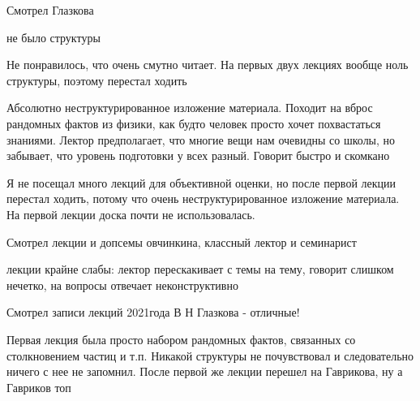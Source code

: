                 \begin{commentbox} 
                    Смотрел Глазкова 
                \end{commentbox} 
            
                \begin{commentbox} 
                    не было структуры 
                \end{commentbox} 
            
                \begin{commentbox} 
                    Не понравилось, что очень смутно читает. На первых двух лекциях вообще ноль структуры, поэтому перестал ходить
                
                \end{commentbox} 
            
                \begin{commentbox} 
                    Абсолютно неструктурированное изложение материала. Походит на вброс рандомных фактов из физики, как будто человек просто хочет похвастаться знаниями. Лектор предполагает, что многие вещи нам очевидны со школы, но забывает, что уровень подготовки у всех разный. Говорит быстро и скомкано 
                \end{commentbox} 
            
                \begin{commentbox} 
                    Я не посещал много лекций для объективной оценки, но после первой лекции перестал ходить, потому что очень неструктурированное изложение материала. На первой лекции доска почти не использовалась. 
                \end{commentbox} 
            
                \begin{commentbox} 
                    Смотрел лекции и допсемы овчинкина, классный лектор и семинарист 
                \end{commentbox} 
            
                \begin{commentbox} 
                    лекции крайне слабы: лектор перескакивает с темы на тему, говорит слишком нечетко, на вопросы отвечает неконструктивно
            
                    Смотрел записи лекций 2021года В Н Глазкова - отличные! 
                \end{commentbox} 
            
                \begin{commentbox} 
                    Первая лекция была просто набором рандомных фактов, связанных со столкновением частиц и т.п. Никакой структуры не почувствовал и следовательно ничего с нее не запомнил. После первой же лекции перешел на Гаврикова, ну а Гавриков топ 
                \end{commentbox} 
            
